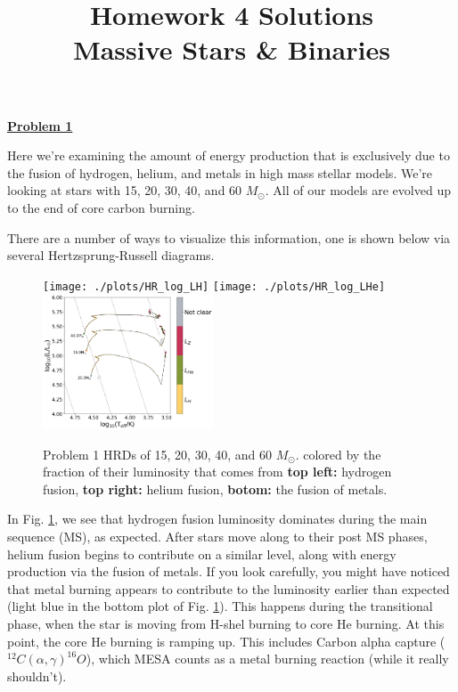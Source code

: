 \documentclass[11pt]{article}
\title{Homework 4 Solutions\\Massive Stars \& Binaries}
\date{}
\newcommand{\msol}{M_\odot}
\renewcommand{\section}[1]{\textbf{\underline{#1}}}
\begin{document}
\maketitle
\thispagestyle{fancy}                   %

\vspace{-0.6in}
\section{Problem 1}
\vspace{0.1in}

Here we're examining the amount of energy production that is exclusively due to the fusion of hydrogen, helium, and metals in high mass stellar models. We're looking at stars with 15, 20, 30, 40, and 60 $\msol$.  All of our models are evolved up to the end of core carbon burning.

There are a number of ways to visualize this information, one is shown below via several Hertzsprung-Russell diagrams.

\begin{figure}
\center
\texttt{[image: ./plots/HR\_log\_LH]}
\texttt{[image: ./plots/HR\_log\_LHe]}
\includegraphics[width=0.45\textwidth]{./plots/HR_log_LZ}
\caption{Problem 1 HRDs of 15, 20, 30, 40, and 60 $\msol$. colored by the fraction of their luminosity  that comes from \textbf{top left:} hydrogen fusion, \textbf{top right:} helium fusion, \textbf{botom:} the  fusion of metals.}
 \label{fig:p1_a}
\end{figure}


In Fig. \ref{fig:p1_a}, we see that hydrogen fusion luminosity dominates during the main sequence (MS), as expected. After stars move along to their post MS phases, helium fusion begins to contribute on a similar level, along with energy production via the fusion of metals. 
If you look carefully, you might have noticed that metal burning appears to contribute to the luminosity earlier than expected (light blue in the bottom plot of  Fig. \ref{fig:p1_a}). This happens during the transitional phase, when the star is moving from H-shel burning to core He burning. At this point, the core He burning is ramping up. This includes Carbon alpha capture ($^{12}C(\alpha, \gamma) ^{16}O$), which MESA counts as a metal burning reaction (while it really shouldn't).
 
\end{document}
